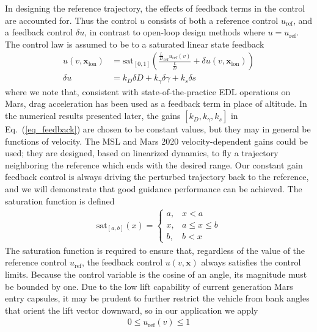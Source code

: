 \documentclass[journal ]{new-aiaa}
\newcommand{\state}{\ensuremath{\mathbf{x}}}
\newcommand{\ur}{\ensuremath{u_{\mathrm{ref}}}}
\begin{document}
In designing the reference trajectory, the effects of feedback terms in the control are accounted for. Thus the control $u$ consists of both a reference control $\ur$, and a feedback control $\delta u$, in contrast to open-loop design methods where $u=\ur$. 
The control law is assumed to be to a saturated linear state feedback 
\begin{align}
u(v,\state_{\mathrm{lon}}) &= \mathrm{sat}_{[0,1]}\left(\frac{\frac{L}{D}_{\mathrm{ref}}\ur(v)}{\frac{L}{D}} + \delta u(v,\state_{\mathrm{lon}})\right) \label{eq_control}\\
\delta u &= k_D\delta D + k_{\gamma}\delta\gamma + k_s\delta s \label{eq_feedback}
\end{align}
where we note that, consistent with state-of-the-practice EDL operations on Mars, drag acceleration has been used as a feedback term in place of altitude. 
In the numerical results presented later, the gains $[k_D, k_{\gamma}, k_s]$ in Eq.~(\ref{eq_feedback}) are chosen to be constant values, but they may in general be functions of velocity. 
The MSL and Mars 2020 velocity-dependent gains could be used; they are designed, based on linearized dynamics, to fly a trajectory neighboring the reference which ends with the desired range. Our constant gain feedback control is always driving the perturbed trajectory back to the reference, and we will demonstrate that good guidance performance can be achieved. %
The saturation function is defined
\begin{align*}
\mathrm{sat}_{[a,b]}(x) = \left\{\begin{array}{lc}
        a, &  x < a\\
        x, &  a\le x \le b\\
        b, &  b < x
        \end{array} \right. %
\end{align*}
The saturation function is required to ensure that, regardless of the value of the reference control \ur, the feedback control $u(v,\state)$ always satisfies the control limits. Because the control variable is the cosine of an angle, its magnitude must be bounded by one. Due to the low lift capability of current generation Mars entry capsules, it may be prudent to further restrict the vehicle from bank angles that orient the lift vector downward, so in our application we apply
\begin{align}
	0 \le \ur(v) \le 1 \label{eq_control_bounds}
\end{align}
\end{document}
